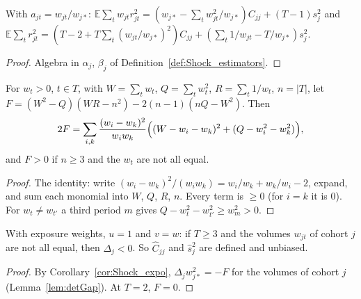 \begin{corollary}\label{cor:Shock_expo}
  \leanok
  With $a_{jt} = w_{jt}/w_{j*}$:
  $\mathbb E\sum_t w_{jt}r_{jt}^2 = (w_{j*} - \sum_t w_{jt}^2/w_{j*})C_{jj} + (T-1)s_j^2$ and
  $\mathbb E\sum_t r_{jt}^2 = (T - 2 + T\sum_t (w_{jt}/w_{j*})^2)C_{jj}
    + (\sum_t 1/w_{jt} - T/w_{j*})s_j^2$.
\end{corollary}
\begin{proof}
  \leanok
  Algebra in $\alpha_j$, $\beta_j$ of Definition~\ref{def:Shock_estimators}.
\end{proof}

\begin{lemma}\label{lem:detGap}
  \leanok
  For $w_t > 0$, $t \in T$, with $W = \sum_t w_t$, $Q = \sum_t w_t^2$, $R = \sum_t 1/w_t$,
  $n = |T|$, let $F = (W^2 - Q)(WR - n^2) - 2(n-1)(nQ - W^2)$. Then
  \[
    2F = \sum_{i,k} \frac{(w_i - w_k)^2}{w_i w_k}
      \Bigl((W - w_i - w_k)^2 + (Q - w_i^2 - w_k^2)\Bigr),
  \]
  and $F > 0$ if $n \ge 3$ and the $w_t$ are not all equal.
\end{lemma}
\begin{proof}
  \leanok
  The identity: write $(w_i-w_k)^2/(w_iw_k) = w_i/w_k + w_k/w_i - 2$, expand, and sum each
  monomial into $W$, $Q$, $R$, $n$. Every term is $\ge 0$ (for $i = k$ it is $0$). For
  $w_t \ne w_{t'}$ a third period $m$ gives $Q - w_t^2 - w_{t'}^2 \ge w_m^2 > 0$.
\end{proof}

\begin{theorem}\label{thm:Shock_det_expo_neg}
  \leanok
  With exposure weights, $u = 1$ and $v = w$: if $T \ge 3$ and the volumes $w_{jt}$ of
  cohort $j$ are not all equal, then $\Delta_j < 0$. So $\hat C_{jj}$ and $\hat s_j^2$ are
  defined and unbiased.
\end{theorem}
\begin{proof}
  \leanok
  By Corollary~\ref{cor:Shock_expo}, $\Delta_j w_{j*}^2 = -F$ for the volumes of cohort $j$
  (Lemma~\ref{lem:detGap}). At $T = 2$, $F = 0$.
\end{proof}

